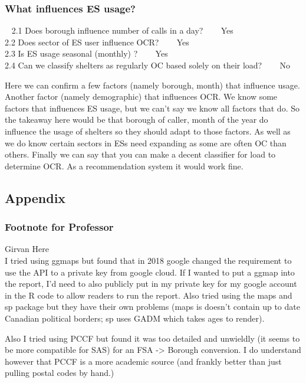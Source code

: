 \documentclass[
]{article}
\begin{document}
\hypertarget{what-influences-es-usage-1}{%
\subsubsection{What influences ES
usage?}\label{what-influences-es-usage-1}}

~ 2.1 Does borough influence number of calls in a day? ~~~ Yes\\
\hspace*{0.333em} 2.2 Does sector of ES user influence OCR? ~~~ Yes\\
\hspace*{0.333em} 2.3 Is ES usage seasonal (monthly) ? ~~~ Yes\\
\hspace*{0.333em} 2.4 Can we classify shelters as regularly OC based
solely on their load? ~~~ No

Here we can confirm a few factors (namely borough, month) that influence
usage. Another factor (namely demographic) that influences OCR. We know
some factors that influences ES usage, but we can't say we know all
factors that do. So the takeaway here would be that borough of caller,
month of the year do influence the usage of shelters so they should
adapt to those factors. As well as we do know certain sectors in ESs
need expanding as some are often OC than others. Finally we can say that
you can make a decent classifier for load to determine OCR. As a
recommendation system it would work fine.

\hypertarget{appendix}{%
\subsection{Appendix}\label{appendix}}

\hypertarget{footnote-for-professor}{%
\subsubsection{Footnote for Professor}\label{footnote-for-professor}}

Girvan Here\\
I tried using ggmaps but found that in 2018 google changed the
requirement to use the API to a private key from google cloud. If I
wanted to put a ggmap into the report, I'd need to also publicly put in
my private key for my google account in the R code to allow readers to
run the report. Also tried using the maps and sp package but they have
their own problems (maps is doesn't contain up to date Canadian
political borders; sp uses GADM which takes ages to render).

Also I tried using PCCF but found it was too detailed and unwieldly (it
seems to be more compatible for SAS) for an FSA -\textgreater{} Borough
conversion. I do understand however that PCCF is a more academic source
(and frankly better than just pulling postal codes by hand.)
\end{document}
